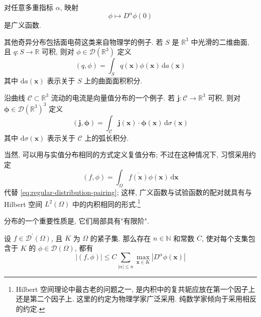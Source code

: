 \begin{Example}
\label{ex:point-derivative-functional}
对任意多重指标 $\alpha$, 映射 \[\phi\mapsto D^\alpha\phi(0)\] 是广义函数.
\end{Example}

\begin{Example}
\label{ex:surface-charge-distribution}
其他奇异分布包括面电荷这类来自物理学的例子. 若 $S$ 是 $\mathbb{R}^3$ 中光滑的二维曲面, 且 $q:S\to\mathbb{R}$ 可积, 则对 $\phi\in\mathcal{D}(\mathbb{R}^3)$ 定义\[(q,\phi)=\int_Sq(\bm{x})\phi(\bm{x})\,\mathrm{d}a(\bm{x})\]其中 $\mathrm{d}a(\bm{x})$ 表示关于 $S$ 上的曲面面积积分.
\end{Example}

\begin{Example}
\label{ex:curve-current-distribution}
沿曲线 $\mathcal{C}\subset\mathbb{R}^3$ 流动的电流是向量值分布的一个例子. 若 $\bm{j}:\mathcal{C}\to\mathbb{R}^3$ 可积, 则对 $\bm{\phi}\in\mathcal{D}(\mathbb{R}^3)^3$ 定义\[(\bm{j},\bm{\phi})=\int_{\mathcal{C}}\bm{j}(\bm{x})\cdot\bm{\phi}(\bm{x})\,\mathrm{d}\sigma(\bm{x})\]其中 $\mathrm{d}\sigma(\bm{x})$ 表示关于 $\mathcal{C}$ 上的弧长积分.
\end{Example}

\begin{Remark}
\label{rem:complex-distribution-convention}
当然, 可以用与实值分布相同的方式定义复值分布; 不过在这种情况下, 习惯采用约定
\begin{equation}\label{eq:complex-distribution-conjugate-pairing}
(f,\phi)=\int_\Omega\overline{f(\bm{x})}\phi(\bm{x})\,\mathrm{d}\bm{x}
\end{equation}
代替 \eqref{eq:regular-distribution-pairing}; 这样, 广义函数与试验函数的配对就具有与 Hilbert 空间 $L^2(\Omega)$ 中的内积相同的形式.\footnote{Hilbert 空间理论中最古老的问题之一, 是内积中的复共轭应放在第一个因子上还是第二个因子上. 这里的约定为物理学家广泛采用. 纯数学家倾向于采用相反的约定.}
\end{Remark}

分布的一个重要性质是, 它们局部具有"有限阶".

\begin{Lemma}
\label{lem:distribution-local-finite-order}
设 $f\in\mathcal{D}^{\prime}(\Omega)$, 且 $K$ 为 $\Omega$ 的紧子集. 那么存在 $n\in\mathbb{N}$ 和常数 $C$, 使对每个支集包含于 $K$ 的 $\phi\in\mathcal{D}(\Omega)$, 都有
\begin{equation}\label{eq:distribution-local-finite-order-bound}
|(f,\phi)|\leq C\sum_{|\alpha|\leq n}\max_{\bm{x}\in K}|D^\alpha\phi(\bm{x})|
\end{equation}

\end{Lemma}

